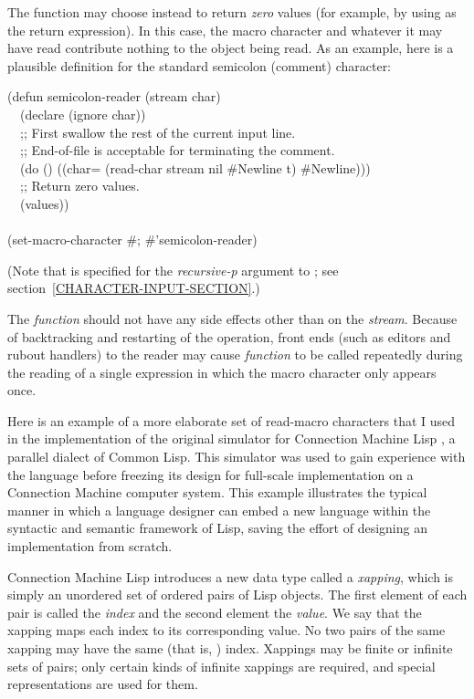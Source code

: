 \begin{defun}[Function]
The function may choose instead to return \emph{zero} values
(for example, by using  as the return expression).
In this case, the macro character and whatever it may have read
contribute nothing to the object being read.
As an example, here is a plausible definition for the standard semicolon
(comment) character:
\begin{lisp}
(defun semicolon-reader (stream char) \\
~~(declare (ignore char)) \\
~~;; First swallow the rest of the current input line. \\
~~;; End-of-file is acceptable for terminating the comment. \\
~~(do () ((char= (read-char stream nil \#{\Xbackslash}Newline t) \#{\Xbackslash}Newline))) \\
~~;; Return zero values. \\
~~(values)) \\
 \\
(set-macro-character \#{\Xbackslash}; \#'semicolon-reader)
\end{lisp}
(Note that {\true} is specified for the \emph{recursive-p} argument
to ; see section~\ref{CHARACTER-INPUT-SECTION}.)

The \emph{function} should not have any side effects other than on the
\emph{stream}.
Because of backtracking and restarting of the  operation,
front ends (such as editors and
rubout handlers) to the reader may cause
\emph{function} to be called repeatedly during the
reading of a single expression in which the macro character only appears
once.

\begin{new}
Here is an example of a more elaborate set of read-macro characters
that I used in the implementation of the original
simulator for Connection Machine Lisp
\cite{CONNECTION-MACHINE-LISP,CMLISP-IMPLEMENTATION},
a parallel dialect of Common Lisp.  This simulator was used to gain experience with
the language before freezing its design for full-scale implementation on a
Connection Machine computer system.  This example illustrates the typical manner
in which a language designer can embed a new language within the syntactic and
semantic framework of Lisp, saving the effort of designing an implementation
from scratch.

Connection Machine Lisp introduces a new data type called a \emph{xapping},
which is simply an unordered set of ordered pairs of Lisp objects.
The first element of each pair is called the \emph{index} and the second element
the \emph{value}.  We say that the xapping maps each index to its corresponding value.
No two pairs of the same xapping may have the same (that is, ) index.
Xappings may be finite or infinite sets of pairs; only certain kinds
of infinite xappings are required, and special representations are used for them.


\end{new}
\end{defun}

